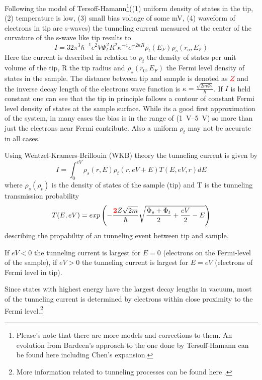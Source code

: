 Following the model of  
Tersoff-Hamann\footnote{Please's note that there are more models and corrections to them. An evolution from Bardeen's approach to the one done by Tersoff-Hamann can be found here \cite{lounis_theory_2014, wortmann_interpretation_2000} including Chen's expansion.}((1) uniform density of states in the tip, (2) temperature is low, (3) small bias voltage of some mV, (4) waveform of electrons in tip are s-waves) the tunneling current measured at the center of the curvature of the s-wave like tip results to $$I=32\pi^3\hbar^{-1}e^2V\Phi_t^2 R^2\kappa^{-4}e^{-2\kappa R}\rho_t(E_F)\rho_s(r_o,E_F)$$ Here the current is described in relation to $\rho_t$ the density of states per unit volume of the tip, R the tip radius and $\rho_s(r_0,E_F)$ the Fermi level density of states in the sample\cite{bonnell_scanning_1993}. The distance between tip and sample is denoted as \textcolor{red}{\textbf{$Z$}} and the inverse decay length of the electrons wave function is $\kappa=\frac{\sqrt{2m\Phi_t}}{\hbar}$. If $I$ is held constant one can see that the tip in principle follows a contour of constant Fermi level density of states at the sample surface. While its a good first approximation of the system, in many cases the bias is in the range of (\SIrange{1}{5}{\V}) so more than just the electrons near Fermi contribute. Also a uniform $\rho_t$ may not be accurate in all cases.

Using  Wentzel-Kramers-Brillouin (WKB) theory\cite{wentzel_verallgemeinerung_1926, kramers_wellenmechanik_1926, brillouin_mecanique_1926} the tunneling current is given by
\begin{equation}
I=\int_0^{eV}\rho_s(r,E)\rho_t(r,eV+E)T(E,eV,r)dE
\label{WKB}
\end{equation}
where $\rho_s(\rho_t)$ is the density of states of the sample (tip) and T is the tunneling transmission probability
\begin{equation}
T(E,eV)=exp\left(-\frac{\textcolor{red}{\textbf{2}}Z\sqrt{2m}}{\hbar}\sqrt{\frac{\Phi_s+\Phi_t}{2}+\frac{eV}{2}-E}\right)
\label{Transmission-function} 
\end{equation}
describing the propability of an tunneling event between tip and sample.

If $eV<0$ the tunneling current is largest for $E=0$ (electrons on the Fermi-level of the sample), if $eV>0$ the tunneling current is largest for $E=eV$ (electrons of Fermi level in tip).

Since states with highest energy have the largest decay lengths in vacuum, most of the tunneling current is determined by electrons within close proximity to the Fermi level.\footnote{More information related to tunneling processes can be found here \cite{bonnell_scanning_1993}.}

